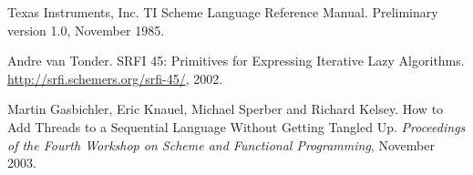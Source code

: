 \begin{thebibliography}{999}
Texas Instruments, Inc.
TI Scheme Language Reference Manual.
Preliminary version 1.0, November 1985. 

Andre van Tonder.
SRFI 45: Primitives for Expressing Iterative Lazy Algorithms.
\url{http://srfi.schemers.org/srfi-45/}, 2002.

Martin Gasbichler, Eric Knauel, Michael Sperber and Richard Kelsey.
How to Add Threads to a Sequential Language Without Getting Tangled Up.
{\em Proceedings of the Fourth Workshop on Scheme and Functional Programming}, November 2003.

\end{thebibliography}
